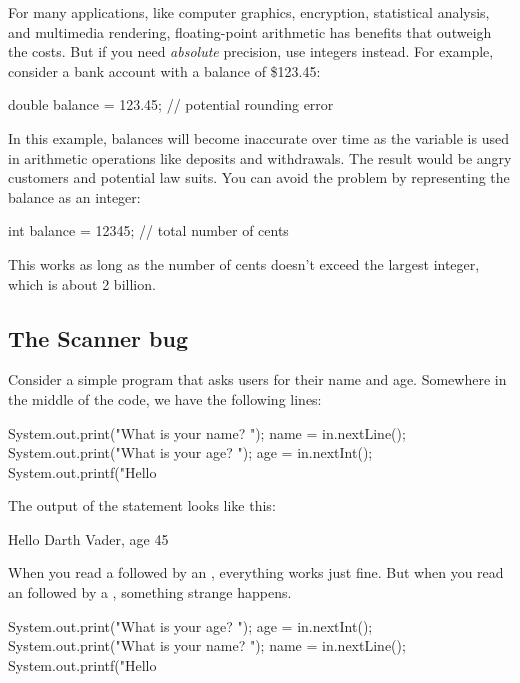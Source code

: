 For many applications, like computer graphics, encryption, statistical analysis, and multimedia rendering, floating-point arithmetic has benefits that outweigh the costs.
But if you need {\em absolute} precision, use integers instead.
For example, consider a bank account with a balance of \$123.45:

\begin{code}
    double balance = 123.45;  // potential rounding error
\end{code}

In this example, balances will become inaccurate over time as the variable is used in arithmetic operations like deposits and withdrawals.
The result would be angry customers and potential law suits.
You can avoid the problem by representing the balance as an integer:

\begin{code}
    int balance = 12345;      // total number of cents
\end{code}

This works as long as the number of cents doesn't exceed the largest integer, which is about 2 billion.



\subsection{The Scanner bug}

Consider a simple program that asks users for their name and age.
Somewhere in the middle of the code, we have the following lines:

\begin{code}
    System.out.print("What is your name? ");
    name = in.nextLine();
    System.out.print("What is your age? ");
    age = in.nextInt();
    System.out.printf("Hello %
\end{code}

The output of the  statement looks like this:

\begin{stdout}
    Hello Darth Vader, age 45
\end{stdout}

When you read a  followed by an , everything works just fine.
But when you read an  followed by a , something strange happens.

\begin{code}
    System.out.print("What is your age? ");
    age = in.nextInt();
    System.out.print("What is your name? ");
    name = in.nextLine();
    System.out.printf("Hello %
\end{code}

